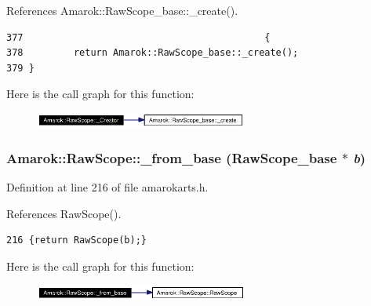 References Amarok::Raw\-Scope\_\-base::\_\-create().



\footnotesize\begin{verbatim}377                                           {
378         return Amarok::RawScope_base::_create();
379 }
\end{verbatim}\normalsize 


Here is the call graph for this function:\begin{figure}[H]
\begin{center}
\leavevmode
\includegraphics[width=197pt]{classAmarok_1_1RawScope_Amarok_1_1RawScopeh0_cgraph}
\end{center}
\end{figure}
\subsubsection{ Amarok::Raw\-Scope::\_\-from\_\-base ({\bf Raw\-Scope\_\-base} $\ast$ {\em b})\hspace{0.3cm}{\tt  [inline, static]}}\label{classAmarok_1_1RawScope_Amarok_1_1RawScopee1}




Definition at line 216 of file amarokarts.h.

References Raw\-Scope().



\footnotesize\begin{verbatim}216 {return RawScope(b);}
\end{verbatim}\normalsize 


Here is the call graph for this function:\begin{figure}[H]
\begin{center}
\leavevmode
\includegraphics[width=198pt]{classAmarok_1_1RawScope_Amarok_1_1RawScopee1_cgraph}
\end{center}
\end{figure}
